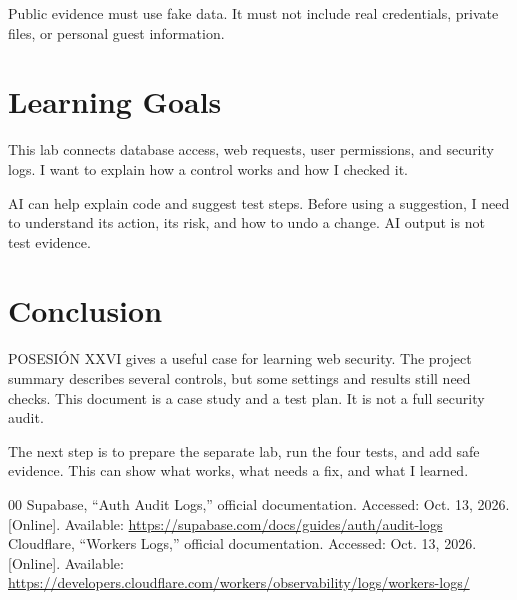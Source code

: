 \documentclass[conference]{IEEEtran}
\begin{document}
Public evidence must use fake data. It must not include real credentials, private files, or personal guest information.

\section{Learning Goals}
This lab connects database access, web requests, user permissions, and security logs. I want to explain how a control works and how I checked it.

AI can help explain code and suggest test steps. Before using a suggestion, I need to understand its action, its risk, and how to undo a change. AI output is not test evidence.

\section{Conclusion}
POSESI\'ON XXVI gives a useful case for learning web security. The project summary describes several controls, but some settings and results still need checks. This document is a case study and a test plan. It is not a full security audit.

The next step is to prepare the separate lab, run the four tests, and add safe evidence. This can show what works, what needs a fix, and what I learned.

\begin{thebibliography}{00}
 Supabase, ``Auth Audit Logs,'' official documentation. Accessed: Oct. 13, 2026. [Online]. Available: \url{https://supabase.com/docs/guides/auth/audit-logs}
 Cloudflare, ``Workers Logs,'' official documentation. Accessed: Oct. 13, 2026. [Online]. Available: \url{https://developers.cloudflare.com/workers/observability/logs/workers-logs/}
\end{thebibliography}
\end{document}
